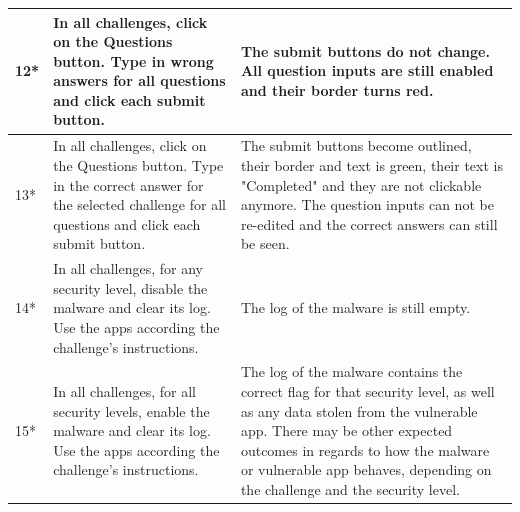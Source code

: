 \begin{center}
\begin{longtable}{|p{0.4cm} |p{5.2cm} |p{7.4cm} |}
         \hline
         12* & In all challenges, click on the Questions button. Type in wrong answers for all questions and click each submit button. & The submit buttons do not change. All question inputs are still enabled and their border turns red. \\
         \hline
         13* & In all challenges, click on the Questions button. Type in the correct answer for the selected challenge for all questions and click each submit button. & The submit buttons become outlined, their border and text is green, their text is "Completed" and they are not clickable anymore. The question inputs can not be re-edited and the correct answers can still be seen. \\
         \hline
         14* & In all challenges, for any security level, disable the malware and clear its log. Use the apps according the challenge's instructions. & The log of the malware is still empty. \\
         \hline
         15* & In all challenges, for all security levels, enable the malware and clear its log. Use the apps according the challenge's instructions. & The log of the malware contains the correct flag for that security level, as well as any data stolen from the vulnerable app. There may be other expected outcomes in regards to how the malware or vulnerable app behaves, depending on the challenge and the security level.\\
         \hline

        \end{longtable}
    \end{center}